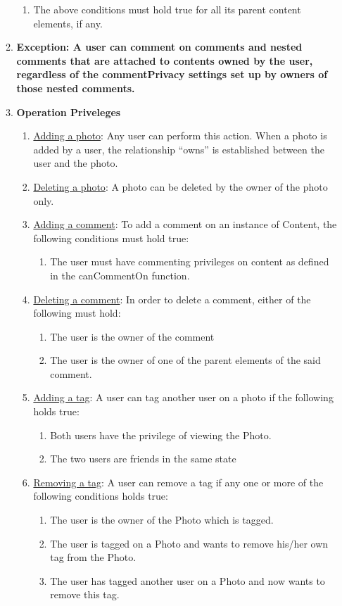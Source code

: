\documentclass[titlepage]{article}
\begin{document}
\begin{enumerate}
\begin{enumerate}
\begin{enumerate}
	\item The above conditions must hold true for all its parent content elements, if any.
\end{enumerate}
\item\textbf{Exception: A user can comment on comments and nested comments that are attached to contents owned by the user, regardless of the commentPrivacy settings set up by owners of those nested comments.}
\item\textbf{Operation Priveleges}
\begin{enumerate}
	\item \underline{Adding a photo}: Any user can perform this action. When a photo is added by a user, the relationship “owns” is established between the user and the photo.
	\item \underline{Deleting a photo}: A photo can be deleted by the owner of the photo only.
	\item \underline{Adding a comment}: To add a comment on an instance of Content, the following conditions must hold true:
	      \begin{enumerate}
		      \item The user must have commenting privileges on content as defined in the canCommentOn function.
	      \end{enumerate}
	\item \underline{Deleting a comment}: In order to delete a comment, either of the following must hold:
	      \begin{enumerate}
		      \item The user is the owner of the comment
		      \item The user is the owner of one of the parent elements of the said comment.
		            \end {enumerate}
		      \item \underline{Adding a tag}: A user can tag another user on a photo if the following holds true:
		            \begin{enumerate}
			            \item Both users have the privilege of viewing the Photo.
			            \item The two users are friends in the same state
		            \end{enumerate}
		      \item \underline{Removing a tag}: A user can remove a tag if any one or more of the following conditions holds true:
		            \begin{enumerate}
			            \item The user is the owner of the Photo which is tagged.
			            \item The user is tagged on a Photo and wants to remove his/her own tag from the Photo.
			            \item The user has tagged another user on a Photo and now wants to remove this tag.
		            \end{enumerate}
	      \end{enumerate}
	      \end{enumerate}
\end{enumerate}
\end{document}
